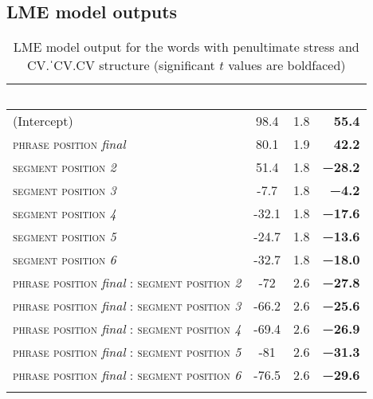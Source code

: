 \documentclass[output=paper]{langscibook}
\begin{document}
\begin{paperappendix}
\section{LME model outputs}\label{appendix:schuboe:b}

\begin{table}[H]
    \caption{LME model output for the words with penultimate stress and CV.ˈCV.CV structure (significant $t$ values are boldfaced)}
    \begin{tabular}{l S[table-format=-2.1] c r}
    \lsptoprule
     \ &  &  &   \\
    \midrule
    (Intercept) & 98.4 & 1.8   & \textbf{55.4} \\
    \textsc{phrase position} \textit{final} & 80.1 & 1.9 & \textbf{42.2} \\
    \textsc{segment position} \textit{2} & 51.4 & 1.8 & \textbf{−28.2} \\
    \textsc{segment position} \textit{3} & -7.7 & 1.8 & \textbf{−4.2} \\
    \textsc{segment position} \textit{4} & -32.1 & 1.8 & \textbf{−17.6} \\
    \textsc{segment position} \textit{5} & -24.7 & 1.8 & \textbf{−13.6} \\
    \textsc{segment position} \textit{6} & -32.7 & 1.8 & \textbf{−18.0} \\
    \textsc{phrase position} \textit{final} : \textsc{segment position} \textit{2} & -72 & 2.6 & \textbf{−27.8} \\
    \textsc{phrase position} \textit{final} : \textsc{segment position} \textit{3} & -66.2 & 2.6 & \textbf{−25.6} \\
    \textsc{phrase position} \textit{final} : \textsc{segment position} \textit{4} & -69.4 & 2.6 & \textbf{−26.9} \\
    \textsc{phrase position} \textit{final} : \textsc{segment position} \textit{5} & -81 & 2.6 & \textbf{−31.3} \\
     \textsc{phrase position} \textit{final} : \textsc{segment position} \textit{6} & -76.5 & 2.6 & \textbf{−29.6} \\
    \lspbottomrule
    \end{tabular}
\end{table}



\end{paperappendix}
\end{document}
